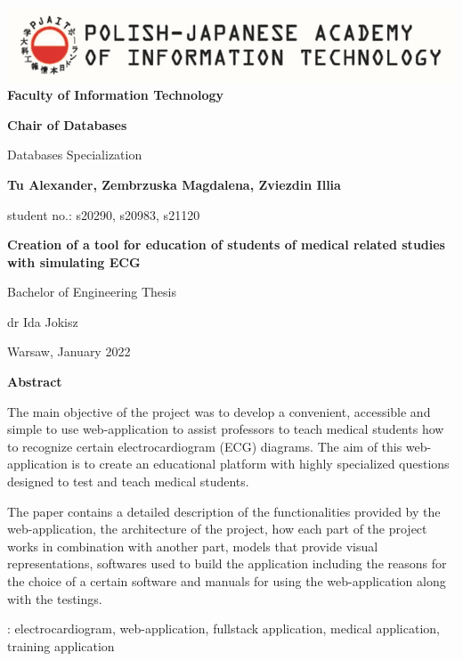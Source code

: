 \documentclass[singlespacing,12pt,parskip,headsepline,consistentlayout]{article}
\begin{document}
\begin{titlepage}
\centering
\begin{center}
\includegraphics{pjatk_icon.png}
\vspace{1cm}
{\bfseries Faculty of Information Technology}

\vspace{1cm}
{\bfseries Chair of Databases}

{Databases Specialization}

\vspace{3cm}
{\bfseries Tu Alexander, Zembrzuska Magdalena, Zviezdin Illia}

{student no.: s20290, s20983, s21120}

\vspace{2cm}

{\bfseries Creation of a tool for education of students of medical related studies with simulating ECG}

\vspace{2cm}    
\end{center}

\begin{flushright}
{Bachelor of Engineering Thesis}

{dr Ida Jokisz}
\end{flushright}

\vfill
\begin{center}
{Warsaw, January 2022 }    
\end{center}

\end{titlepage}
\pagebreak
\begin{titlepage}
\begin{center}
    {\large\bfseries Abstract}
\end{center}

{The main objective of the project was to develop a convenient, accessible and simple to use web-application to assist professors to teach medical students how to recognize certain electrocardiogram (ECG) diagrams. The aim of this web-application is to create an educational platform with highly specialized questions designed to test and teach medical students.}
\vspace{1cm}

{The paper contains a detailed description of the functionalities provided by the web-application, the architecture of the project, how each part of the project works in combination with another part, models that provide visual representations, softwares used to build the application including the reasons for the choice of a certain software and manuals for using the web-application along with the testings.}

\vfill
{}: electrocardiogram, web-application, fullstack application, medical application, training application
\end{titlepage}
\end{document}
